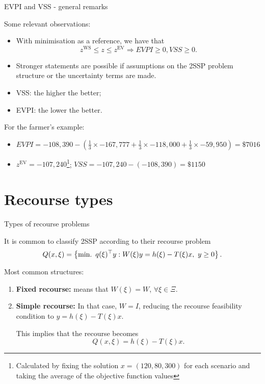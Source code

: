 	
\begin{frame}{EVPI and VSS - general remarks}

	Some relevant observations:
	\vspace{-6pt}
	\begin{itemize}
		\item With minimisation as a reference, we have that
		$$
			z^{\text{WS}} \le z \le z^{\text{EV}} \Rightarrow EVPI \ge 0, VSS \ge 0.
		$$
		\item Stronger statements are possible if assumptions on the 2SSP problem structure or the uncertainty terms are made.
		\item VSS: the \alert{higher} the better;
		\item EVPI: the \alert{lower} the better.
	\end{itemize}
	
	\pause
	For the farmer's example:
	\vspace{-6pt}
	\begin{itemize}
		\item $EVPI = -108,390- \left(\frac{1}{3}\times -167,777 + \frac{1}{3}\times -118,000 + \frac{1}{3}\times -59,950\right)  = \$7016$ 
		\item $z^{\text{EV}} = -107,240$\footnote{Calculated by fixing the solution $x=(120,80,300)$ for each scenario and taking the average of the objective function values}; $VSS = -107,240 - (-108,390) = \$1150$
	\end{itemize}
	\vspace{6pt}
\end{frame}


\section{Recourse types}


\begin{frame}{Types of recourse problems}

	It is common to classify 2SSP according to their \alert{recourse problem} 
	\begin{equation*}
		Q(x, \xi) = \left\{ \mathop{\text{min.} \ } q(\xi)^\top y : W(\xi)y = h(\xi) - T(\xi)x, \ y \ge 0 \right \}.	
	\end{equation*}
	
	Most common structures:
	\begin{enumerate}[<+->]
		\item {\bf Fixed recourse:} means that $W(\xi) = W$, $\forall \xi \in \Xi$.
		\item {\bf Simple recourse:} In that case, $W = I$, reducing the recourse feasibility condition to $y = h(\xi) - T(\xi)x$. 
		\vspace{6pt}
		
		This implies that the recourse becomes
		$$
		 Q(x,\xi) = h(\xi) - T(\xi)x.
		$$ 
	\end{enumerate} 
	
\end{frame}


